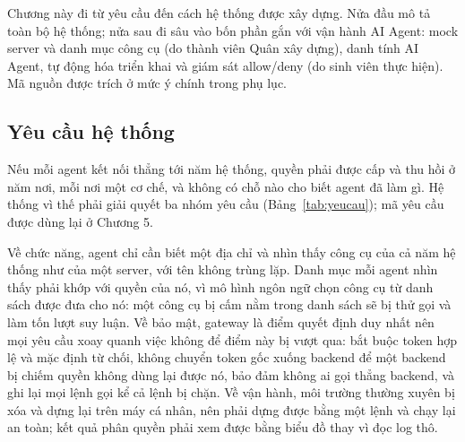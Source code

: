 
Chương này đi từ yêu cầu đến cách hệ thống được xây dựng. Nửa đầu mô tả toàn bộ hệ thống; nửa sau đi sâu vào bốn phần gắn với vận hành AI Agent: mock server và danh mục công cụ (do thành viên Quân xây dựng), danh tính AI Agent, tự động hóa triển khai và giám sát allow/deny (do sinh viên thực hiện). Mã nguồn được trích ở mức ý chính trong phụ lục.

\subsection{Yêu cầu hệ thống}

Nếu mỗi agent kết nối thẳng tới năm hệ thống, quyền phải được cấp và thu hồi ở năm nơi, mỗi nơi một cơ chế, và không có chỗ nào cho biết agent đã làm gì. Hệ thống vì thế phải giải quyết ba nhóm yêu cầu (Bảng~\ref{tab:yeucau}); mã yêu cầu được dùng lại ở Chương 5.

Về chức năng, agent chỉ cần biết một địa chỉ và nhìn thấy công cụ của cả năm hệ thống như của một server, với tên không trùng lặp. Danh mục mỗi agent nhìn thấy phải khớp với quyền của nó, vì mô hình ngôn ngữ chọn công cụ từ danh sách được đưa cho nó: một công cụ bị cấm nằm trong danh sách sẽ bị thử gọi và làm tốn lượt suy luận. Về bảo mật, gateway là điểm quyết định duy nhất nên mọi yêu cầu xoay quanh việc không để điểm này bị vượt qua: bắt buộc token hợp lệ và mặc định từ chối, không chuyển token gốc xuống backend để một backend bị chiếm quyền không dùng lại được nó, bảo đảm không ai gọi thẳng backend, và ghi lại mọi lệnh gọi kể cả lệnh bị chặn. Về vận hành, môi trường thường xuyên bị xóa và dựng lại trên máy cá nhân, nên phải dựng được bằng một lệnh và chạy lại an toàn; kết quả phân quyền phải xem được bằng biểu đồ thay vì đọc log thô.

